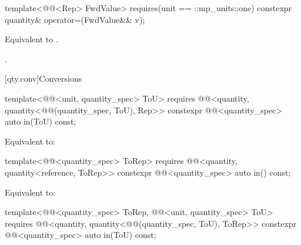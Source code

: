\begin{itemdecl}
template<@@<Rep> FwdValue>
  requires(unit == ::mp_units::one)
constexpr quantity& operator=(FwdValue&& v);
\end{itemdecl}

\begin{itemdescr}
\pnum
\effects
Equivalent to .

\pnum
\returns
{}.
\end{itemdescr}

[qty.conv]{Conversions}

\begin{itemdecl}
template<@@<unit, quantity_spec> ToU>
  requires @@<quantity, quantity<@@(quantity_spec, ToU{}), Rep>>
constexpr @@<quantity_spec> auto in(ToU) const;
\end{itemdecl}

\begin{itemdescr}
\pnum
\effects
Equivalent to:
\end{itemdescr}

\begin{itemdecl}
template<@@<quantity_spec> ToRep>
  requires @@<quantity, quantity<reference, ToRep>>
constexpr @@<quantity_spec> auto in() const;
\end{itemdecl}

\begin{itemdescr}
\pnum
\effects
Equivalent to:
\end{itemdescr}

\begin{itemdecl}
template<@@<quantity_spec> ToRep,
         @@<unit, quantity_spec> ToU>
  requires @@<quantity,
                                 quantity<@@(quantity_spec, ToU{}), ToRep>>
constexpr @@<quantity_spec> auto in(ToU) const;
\end{itemdecl}


